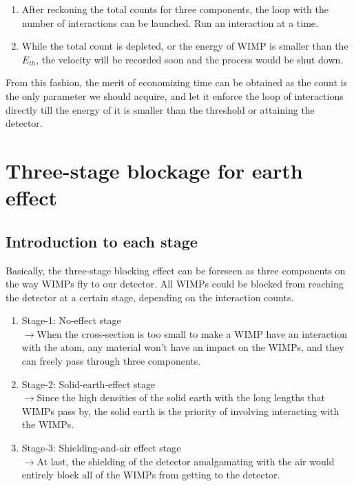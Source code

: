 \begin{enumerate}
	\item After reckoning the total counts for three components, the loop with the number of interactions can be launched. Run an interaction at a time. 
	  
	\item While the total count is depleted, or the energy of WIMP is smaller than the $E_{th}$, the velocity will be recorded soon and the process would be shut down.\\
\end{enumerate}

From this fashion, the merit of economizing time can be obtained as the count is the only parameter we should acquire, and let it enforce the loop of interactions directly till the energy of it is smaller than the threshold or attaining the detector. 

\section{Three-stage blockage for earth effect}
\subsection{Introduction to each stage}
Basically, the three-stage blocking effect can be foreseen as three components on the way WIMPs fly to our detector. All WIMPs could be blocked from reaching the detector at a certain stage, depending on the interaction counts.\\
\begin{enumerate}
\item Stage-1: No-effect stage\\
$\rightarrow$When the cross-section is too small to make a WIMP have an interaction with the atom, any material won't have an impact on the WIMPs, and they can freely pass through three components. 
\item Stage-2: Solid-earth-effect stage\\ 
$\rightarrow$Since the high densities of the solid earth with the long lengths that WIMPs pass by, the solid earth is the priority of involving interacting with the WIMPs. 
\item Stage-3: Shielding-and-air effect stage\\
$\rightarrow$At last, the shielding of the detector amalgamating with the air would entirely block all of the WIMPs from getting to the detector. 

\end{enumerate}

